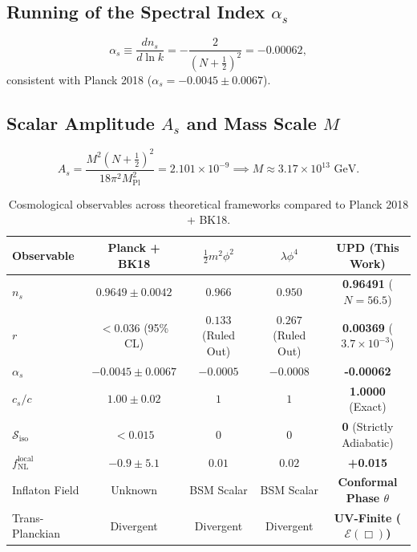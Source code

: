 \documentclass[11pt,a4paper]{article}
\begin{document}
\subsection{Running of the Spectral Index $\alpha_s$}
\begin{equation}
\alpha_s \equiv \frac{dn_s}{d\ln k} = -\frac{2}{\left(N + \frac{1}{2}\right)^2} = -\mathbf{0.00062},
\end{equation}
consistent with Planck 2018 ($\alpha_s = -0.0045 \pm 0.0067$).

\subsection{Scalar Amplitude $A_s$ and Mass Scale $M$}
\begin{equation}
A_s = \frac{M^2 \left(N + \frac{1}{2}\right)^2}{18\pi^2 M_{\mathrm{Pl}}^2} = 2.101 \times 10^{-9} \implies M \approx 3.17 \times 10^{13}\text{ GeV}.
\end{equation}

\begin{table}[htbp]
\centering
\caption{Cosmological observables across theoretical frameworks compared to Planck 2018 + BK18.}
\vspace{2mm}
\begin{tabular}{lcccc}
\toprule
\textbf{Observable} & \textbf{Planck + BK18} & \textbf{$\frac{1}{2}m^2\phi^2$} & \textbf{$\lambda\phi^4$} & \textbf{UPD (This Work)} \\
\midrule
$n_s$ & $0.9649 \pm 0.0042$ & $0.966$ & $0.950$ & \textbf{0.96491} ($N=56.5$) \\
$r$ & $< 0.036$ (95\% CL) & $0.133$ (Ruled Out) & $0.267$ (Ruled Out) & \textbf{0.00369} ($3.7 \times 10^{-3}$) \\
$\alpha_s$ & $-0.0045 \pm 0.0067$ & $-0.0005$ & $-0.0008$ & \textbf{-0.00062} \\
$c_s / c$ & $1.00 \pm 0.02$ & $1$ & $1$ & \textbf{1.0000} (Exact) \\
$\mathcal{S}_{\mathrm{iso}}$ & $< 0.015$ & $0$ & $0$ & \textbf{0} (Strictly Adiabatic) \\
$f_{\mathrm{NL}}^{\mathrm{local}}$ & $-0.9 \pm 5.1$ & $0.01$ & $0.02$ & \textbf{+0.015} \\
Inflaton Field & Unknown & BSM Scalar & BSM Scalar & \textbf{Conformal Phase $\theta$} \\
Trans-Planckian & Divergent & Divergent & Divergent & \textbf{UV-Finite ($\mathcal{E}(\Box)$)} \\
\bottomrule
\end{tabular}
\end{table}
\end{document}
